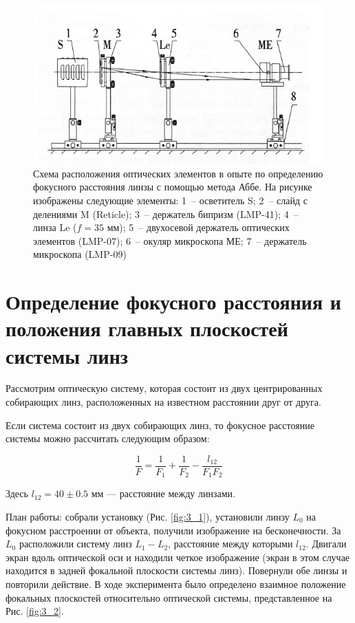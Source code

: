 \documentclass[a4paper, 12pt]{article}
\begin{document}
\begin{figure}[H]
	\centering
	\includegraphics[width=0.7\linewidth]{4}
	\caption{Схема расположения оптических элементов в опыте по определению фокусного расстояния линзы с помощью метода Аббе. На рисунке изображены следующие элементы: 1~-- осветитель S; 2~-- слайд с делениями M (Reticle); 3~-- держатель бипризм (LMP-41); 4~-- линза Le ($f=35$ мм); 5~-- двухосевой держатель оптических элементов (LMP-07); 6~-- окуляр микроскопа МЕ; 7~-- держатель микроскопа (LMP-09)}
	\label{fig:2}
\end{figure}

\section{Определение фокусного расстояния и положения главных плоскостей системы линз}

Рассмотрим оптическую систему, которая состоит из двух центрированных собирающих линз, расположенных на известном расстоянии друг от друга. 

Если система состоит из двух собирающих линз, то фокусное расстояние системы можно рассчитать следующим образом:

\begin{equation}
	\frac{1}{F} = \frac{1}{F_1} + \frac{1}{F_2} - \frac{l_{12}}{F_1 F_2}
	\label{eq:2}
\end{equation}

Здесь $l_{12} = 40 \pm 0.5$ мм --- расстояние между линзами.

План работы: собрали установку (Рис. \ref{fig:3_1}), установили линзу $L_0$ на фокусном расстроении от объекта, получили изображение на бесконечности. За $L_0$ расположили систему линз $L_1-L_2$, расстояние между которыми  $l_{12}$. Двигали экран вдоль оптической оси и находили четкое изображение (экран в этом случае находится в задней фокальной плоскости системы линз). Повернули обе линзы и повторили действие.  В ходе эксперимента было определено взаимное положение фокальных плоскостей относительно оптической системы, представленное на Рис. \ref{fig:3_2}.
\end{document}
